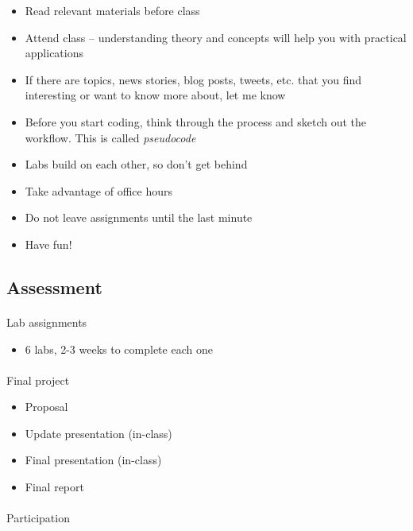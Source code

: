 \documentclass[
  letterpaper,
  DIV=11,
  numbers=noendperiod]{scrartcl}
\makeatletter
\let\oldparagraph\paragraph
\renewcommand{\paragraph}{
    \@ifstar
      \xxxParagraphStar
      \xxxParagraphNoStar
  }
\newcommand{\xxxParagraphStar}[1]{\oldparagraph*{#1}\mbox{}}
\newcommand{\xxxParagraphNoStar}[1]{\oldparagraph{#1}\mbox{}}
\providecommand{\tightlist}{%
  \setlength{\itemsep}{0pt}\setlength{\parskip}{0pt}}
\makeatother
\begin{document}
\begin{itemize}
\tightlist
\item
  Read relevant materials before class
\item
  Attend class -- understanding theory and concepts will help you with
  practical applications
\item
  If there are topics, news stories, blog posts, tweets, etc. that you
  find interesting or want to know more about, let me know
\item
  Before you start coding, think through the process and sketch out the
  workflow. This is called \emph{pseudocode}
\item
  Labs build on each other, so don't get behind
\item
  Take advantage of office hours
\item
  Do not leave assignments until the last minute
\item
  Have fun!
\end{itemize}

\subsection{Assessment}\label{assessment}

\paragraph{Lab assignments}\label{lab-assignments}

\begin{itemize}
\tightlist
\item
  6 labs, 2-3 weeks to complete each one
\end{itemize}

\paragraph{Final project}\label{final-project}

\begin{itemize}
\tightlist
\item
  Proposal
\item
  Update presentation (in-class)
\item
  Final presentation (in-class)
\item
  Final report
\end{itemize}

\paragraph{Participation}\label{participation}
\end{document}

